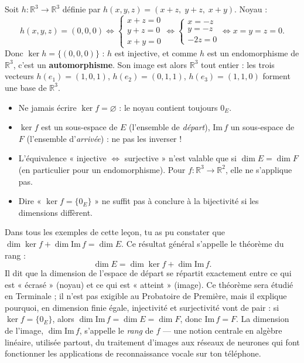 \documentclass[11pt]{article}
\newcommand{\cle}[1]{{\popxbold\color{popdark}#1}}
\begin{document}
\begin{exemplebox}
Soit $h : \mathbb{R}^3 \to \mathbb{R}^3$ définie par $h(x,y,z) = (x + z,\; y + z,\; x + y)$. Noyau :
\[ h(x,y,z) = (0,0,0) \iff \begin{cases} x + z = 0 \\ y + z = 0 \\ x + y = 0 \end{cases} \iff \begin{cases} x = -z \\ y = -z \\ -2z = 0 \end{cases} \iff x = y = z = 0. \]
Donc $\ker h = \{(0,0,0)\}$ : $h$ est injective, et comme $h$ est un endomorphisme de $\mathbb{R}^3$, c'est un \textbf{automorphisme}. Son image est alors $\mathbb{R}^3$ tout entier : les trois vecteurs $h(e_1) = (1,0,1)$, $h(e_2) = (0,1,1)$, $h(e_3) = (1,1,0)$ forment une base de $\mathbb{R}^3$.
\end{exemplebox}

\begin{attention}
\begin{itemize}
\item Ne jamais écrire $\ker f = \varnothing$ : le noyau contient toujours $0_E$.
\item $\ker f$ est un sous-espace de $E$ (l'ensemble de \emph{départ}), $\mathrm{Im}\,f$ un sous-espace de $F$ (l'ensemble d'\emph{arrivée}) : ne pas les inverser !
\item L'équivalence « injective $\iff$ surjective » n'est valable que si $\dim E = \dim F$ (en particulier pour un endomorphisme). Pour $f : \mathbb{R}^3 \to \mathbb{R}^2$, elle ne s'applique pas.
\item Dire « $\ker f = \{0_E\}$ » ne suffit pas à conclure à la bijectivité si les dimensions diffèrent.
\end{itemize}
\end{attention}

\begin{savaistu}
Dans tous les exemples de cette leçon, tu as pu constater que $\dim \ker f + \dim \mathrm{Im}\,f = \dim E$. Ce résultat général s'appelle le \cle{théorème du rang} :
\[ \dim E = \dim \ker f + \dim \mathrm{Im}\,f. \]
Il dit que la dimension de l'espace de départ se répartit exactement entre ce qui est « écrasé » (noyau) et ce qui est « atteint » (image). Ce théorème sera étudié en Terminale ; il n'est pas exigible au Probatoire de Première, mais il explique pourquoi, en dimension finie égale, injectivité et surjectivité vont de pair : si $\ker f = \{0_E\}$, alors $\dim \mathrm{Im}\,f = \dim E = \dim F$, donc $\mathrm{Im}\,f = F$. La dimension de l'image, $\dim \mathrm{Im}\,f$, s'appelle le \emph{rang} de $f$ — une notion centrale en algèbre linéaire, utilisée partout, du traitement d'images aux réseaux de neurones qui font fonctionner les applications de reconnaissance vocale sur ton téléphone.
\end{savaistu}
\end{document}
